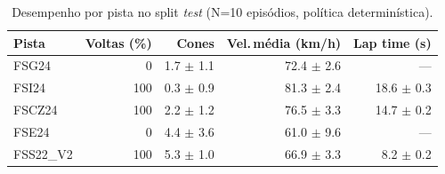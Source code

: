 \begin{table}[H]
\centering
\caption{Desempenho por pista no split \textit{test} (N=10 episódios, política determinística).}
\label{tab:per_track_test}
\begin{tabular}{lrrrr}
\toprule
\textbf{Pista} & \textbf{Voltas (\%)} & \textbf{Cones} & \textbf{Vel.\,m\'edia (km/h)} & \textbf{Lap time (s)} \\
\midrule
FSG24 & 0 & 1.7 $\pm$ 1.1 & 72.4 $\pm$ 2.6 & --- \\
FSI24 & 100 & 0.3 $\pm$ 0.9 & 81.3 $\pm$ 2.4 & 18.6 $\pm$ 0.3 \\
FSCZ24 & 100 & 2.2 $\pm$ 1.2 & 76.5 $\pm$ 3.3 & 14.7 $\pm$ 0.2 \\
FSE24 & 0 & 4.4 $\pm$ 3.6 & 61.0 $\pm$ 9.6 & --- \\
FSS22_V2 & 100 & 5.3 $\pm$ 1.0 & 66.9 $\pm$ 3.3 & 8.2 $\pm$ 0.2 \\
\bottomrule
\end{tabular}
\end{table}
